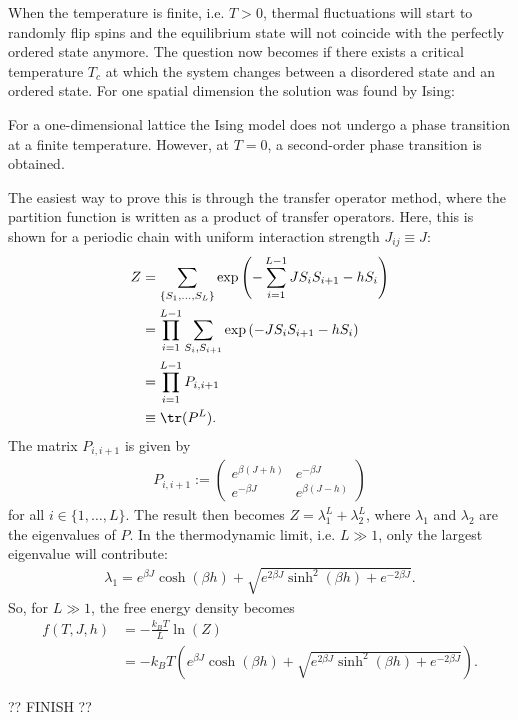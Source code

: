     When the temperature is finite, i.e. $T>0$, thermal fluctuations will start to randomly flip spins and the equilibrium state will not coincide with the perfectly ordered state anymore. The question now becomes if there exists a critical temperature $T_c$ at which the system changes between a disordered state and an ordered state. For one spatial dimension the solution was found by Ising:
    \begin{property}[$d=1$]
        For a one-dimensional lattice the Ising model does not undergo a phase transition at a finite temperature. However, at $T=0$, a second-order phase transition is obtained.

        The easiest way to prove this is through the transfer operator method, where the partition function is written as a product of transfer operators. Here, this is shown for a periodic chain with uniform interaction strength $J_{ij}\equiv J$:
        \begin{align}
            Z &= \sum_{\{S_1,\ldots,S_L\}}\exp\left(-\sum_{i=1}^{L-1}JS_iS_{i+1}-hS_i\right)\\
            &= \prod_{i=1}^{L-1}\sum_{S_i,S_{i+1}}\exp\left(-JS_iS_{i+1}-hS_i\right)\\
            &= \prod_{i=1}^{L-1}P_{i,i+1}\\
            &\equiv\tr(P^L).
        \end{align}
        The matrix $P_{i,i+1}$ is given by
        \begin{gather}
            P_{i,i+1} :=
            \begin{pmatrix}
                e^{\beta(J+h)}&e^{-\beta J}\\
                e^{-\beta J}&e^{\beta(J-h)}
            \end{pmatrix}
        \end{gather}
        for all $i\in\{1,\ldots,L\}$. The result then becomes $Z=\lambda^L_1+\lambda^L_2$, where $\lambda_1$ and $\lambda_2$ are the eigenvalues of $P$. In the thermodynamic limit, i.e. $L\gg1$, only the largest eigenvalue will contribute:
        \begin{gather}
            \lambda_1 = e^{\beta J}\cosh(\beta h) + \sqrt{e^{2\beta J}\sinh^2(\beta h)+e^{-2\beta J}}.
        \end{gather}
        So, for $L\gg1$, the free energy density becomes
        \begin{align*}
            f(T,J,h) &= -\frac{k_BT}{L}\ln(Z)\\
            &= -k_BT\left(e^{\beta J}\cosh(\beta h) + \sqrt{e^{2\beta J}\sinh^2(\beta h)+e^{-2\beta J}}\right).
        \end{align*}

        ?? FINISH ??
    \end{property}

